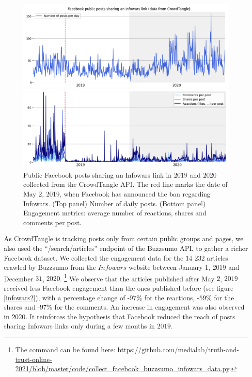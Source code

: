 \documentclass{article}
\begin{document}
\begin{figure}
	\centering
	
	\begin{multicols}{1}
		\includegraphics[scale=0.35]{./img/infowars/fb_infowars_1.png}
	\end{multicols}
	
	\begin{multicols}{1}
		\includegraphics[scale=0.35]{./img/infowars/fb_infowars_2.png} 
	\end{multicols}
	
	\caption{Public Facebook posts sharing an Infowars link in $2019$ and $2020$ collected from the CrowdTangle API. The red line marks the date of May $2$, 2019, when Facebook has announced the ban regarding Infowars. (Top panel) Number of daily posts. (Bottom panel) Engagement metrics: average number of reactions, shares and comments per post. }
	\label{infowars1}
\end{figure}




As CrowdTangle is tracking posts only from certain public groups and pages, we also used the ``/search/articles'' endpoint of the Buzzsumo API, to gather a richer Facebook dataset. We collected the engagement data for the $14$ $232$ articles crawled by Buzzsumo from the $Infowars$ website between January $1$, $2019$ and December $31$, $2020$.  \footnote{The command can be found here: \href{https://github.com/medialab/truth-and-trust-online-2021/blob/master/code/collect\_facebook\_buzzsumo\_infowars\_data.py}{https://github.com/medialab/truth-and-trust-online-2021/blob/master/code/collect\_facebook\_buzzsumo\_infowars\_data.py}.} We observe that the articles published after May $2$, $2019$ received less Facebook engagement than the ones published before (see figure \ref{infowars2}), with a percentage change of -$97\%$ for the reactions, -$59\%$ for the shares and -$97\%$ for the comments. An increase in engagement was also observed in $2020$. It reinforces the hypothesis that Facebook reduced the reach of posts sharing Infowars links only during a few months in $2019$.
\end{document}

